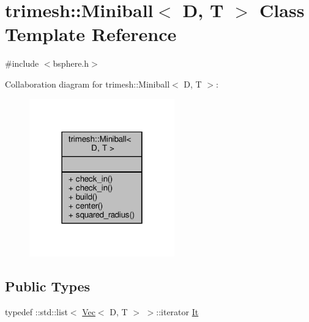 \hypertarget{classtrimesh_1_1Miniball}{}\section{trimesh\+:\+:Miniball$<$ D, T $>$ Class Template Reference}
\label{classtrimesh_1_1Miniball}


{\ttfamily \#include $<$bsphere.\+h$>$}



Collaboration diagram for trimesh\+:\+:Miniball$<$ D, T $>$\+:\nopagebreak
\begin{figure}[H]
\begin{center}
\leavevmode
\includegraphics[width=178pt]{d8/d4e/classtrimesh_1_1Miniball__coll__graph}
\end{center}
\end{figure}
\subsection*{Public Types}
\begin{DoxyCompactItemize}
\item 
typedef \+::std\+::list$<$ \hyperlink{classtrimesh_1_1Vec}{Vec}$<$ D, T $>$ $>$\+::iterator \hyperlink{classtrimesh_1_1Miniball_ab8d1a486a6e2cfda9f6be938180ab3aa}{It}
\end{DoxyCompactItemize}

